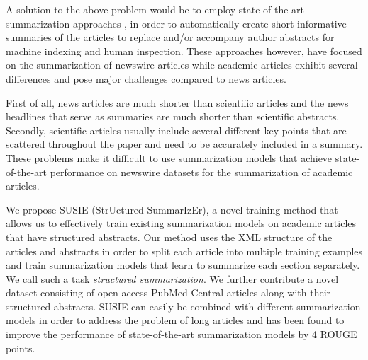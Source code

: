 \documentclass[runningheads]{llncs}
\begin{document}



A solution to the above problem would be to employ state-of-the-art summarization approaches \cite{See2017GetNetworks,Paulus2017ASummarization,Dangovski2019RotationalApplications,Celikyilmaz2018DeepSummarization}, in order to automatically create short informative summaries of the articles to replace and/or accompany author abstracts for machine indexing and human inspection. These approaches however, have focused on the summarization of newswire articles while academic articles exhibit several differences and pose major challenges compared to news articles. 

First of all, news articles are much shorter than scientific articles and the news headlines that serve as summaries are much shorter than scientific abstracts. Secondly, scientific articles usually include several different key points that are scattered throughout the paper and need to be accurately included in a summary. These problems make it difficult to use summarization models that achieve state-of-the-art performance on newswire datasets for the summarization of academic articles.

We propose SUSIE (StrUctured SummarIzEr), a novel training method that allows us to effectively train existing summarization models on academic articles that have structured abstracts. Our method uses the XML structure of the articles and abstracts in order to split each article into multiple training examples and train summarization models that learn to summarize each section separately. We call such a task {\em structured summarization}. We further contribute a novel dataset consisting of open access PubMed Central articles along with their structured abstracts. SUSIE can easily be combined with different summarization models in order to address the problem of long articles and has been found to improve the performance of state-of-the-art summarization models by 4 ROUGE points.
\end{document}
